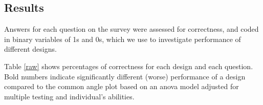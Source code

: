 \subsection{Results}

Answers for each question on the survey were assessed for correctness, and coded in binary variables of 1s and 0s, which we use to investigate performance of different designs. 





Table \ref{raw} shows percentages of correctness for each design and each question. Bold numbers indicate significantly different (worse) performance of a design compared to the common angle plot based on an anova model adjusted for multiple testing and individual's abilities. 


